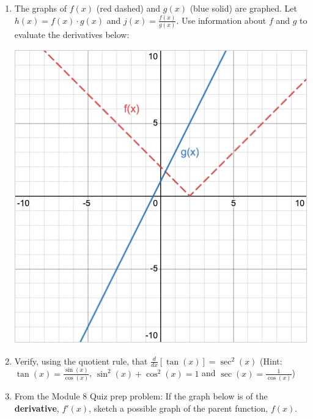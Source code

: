 \documentclass[12pt]{article}
\begin{document}
\begin{enumerate}
\item The graphs of $f\left(x\right)$ (red dashed) and $g\left(x\right)$ (blue solid) are graphed. Let $h(x)=f(x) \cdot g(x)$ and $j(x)=\frac{f(x)}{g(x)}$.  Use information about $f$ and $g$ to evaluate the derivatives below:

\begin{multicols}{2}

\includegraphics[scale=0.4]{fgOne.png}


\end{multicols}

\item Verify, using the quotient rule, that 
    $\displaystyle{\frac{d}{dx}\left[\tan(x)\right]=\sec^2(x)}$ (Hint: $\tan(x)=\frac{\sin(x)}{\cos(x)}$, $\sin^2(x)+\cos^2(x)=1$ and $\sec(x)=\frac{1}{\cos(x)}$)
	\vfill

\item From the Module 8 Quiz prep problem: If the graph below is of the {\bf derivative}, $f'(x)$, sketch a possible graph of the parent function, $f(x)$.


\end{enumerate}
\end{document}
